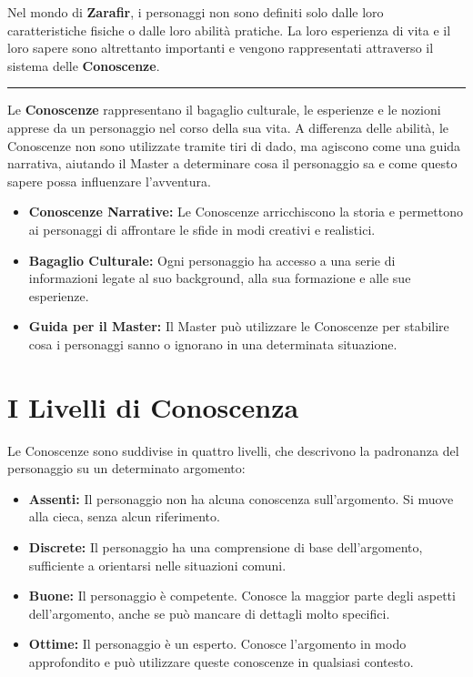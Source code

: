 \documentclass[../manuale_main.tex]{subfiles}
\begin{document}
Nel mondo di \textbf{Zarafir}, i personaggi non sono definiti solo dalle loro caratteristiche fisiche o dalle loro abilità pratiche. La loro esperienza di vita e il loro sapere sono altrettanto importanti e vengono rappresentati attraverso il sistema delle \textbf{Conoscenze}. 


\vspace{0.5cm}
\noindent
\begin{center}
\rule{\textwidth}{0.4pt} 
\end{center}
\vspace{0.5cm}

Le \textbf{Conoscenze} rappresentano il bagaglio culturale, le esperienze e le nozioni apprese da un personaggio nel corso della sua vita. A differenza delle abilità, le Conoscenze non sono utilizzate tramite tiri di dado, ma agiscono come una guida narrativa, aiutando il Master a determinare cosa il personaggio sa e come questo sapere possa influenzare l'avventura.

\begin{itemize}
    \item \textbf{Conoscenze Narrative:} Le Conoscenze arricchiscono la storia e permettono ai personaggi di affrontare le sfide in modi creativi e realistici.
    \item \textbf{Bagaglio Culturale:} Ogni personaggio ha accesso a una serie di informazioni legate al suo background, alla sua formazione e alle sue esperienze.
    \item \textbf{Guida per il Master:} Il Master può utilizzare le Conoscenze per stabilire cosa i personaggi sanno o ignorano in una determinata situazione.
\end{itemize}

\vspace{0.3cm}

\section{I Livelli di Conoscenza}
Le Conoscenze sono suddivise in quattro livelli, che descrivono la padronanza del personaggio su un determinato argomento:

\begin{itemize}
    \item \textbf{Assenti:} Il personaggio non ha alcuna conoscenza sull’argomento. Si muove alla cieca, senza alcun riferimento.
    
    \item \textbf{Discrete:} Il personaggio ha una comprensione di base dell’argomento, sufficiente a orientarsi nelle situazioni comuni.
    
    \item \textbf{Buone:} Il personaggio è competente. Conosce la maggior parte degli aspetti dell’argomento, anche se può mancare di dettagli molto specifici.
    
    \item \textbf{Ottime:} Il personaggio è un esperto. Conosce l’argomento in modo approfondito e può utilizzare queste conoscenze in qualsiasi contesto.
\end{itemize}
\end{document}

